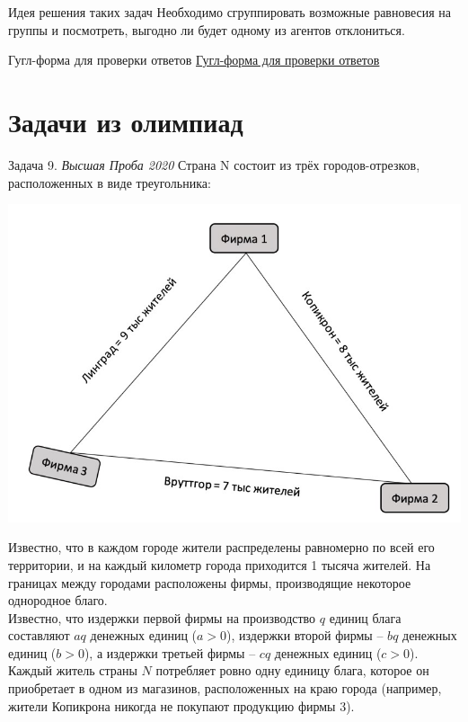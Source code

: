 \begin{mybox}{Идея решения таких задач}
    Необходимо сгруппировать возможные равновесия на группы и посмотреть, выгодно ли будет одному из агентов
    отклониться.
\end{mybox}

\begin{mybox}{Гугл-форма для проверки ответов}
    \href{https://forms.gle/1FkPGARXqSBnACzs8}{Гугл-форма для проверки ответов}
\end{mybox}

\section{Задачи из олимпиад}

\begin{mybox}{Задача 9. \textit{Высшая Проба 2020}}
    \indent\setlength{\parindent}{1em}\indent\setlength{\parindent}{1em}Страна N состоит из трёх городов-отрезков,
    расположенных в виде треугольника:
    \begin{center}
        \includegraphics[width=0.5\linewidth]{static/4_9}
    \end{center}
    \indent\setlength{\parindent}{1em}\indent\setlength{\parindent}{1em}Известно, что в каждом городе жители
    распределены равномерно по всей его территории, и на каждый километр города приходится 1 тысяча жителей. На
    границах между городами расположены фирмы, производящие некоторое однородное благо.\\
    \indent\setlength{\parindent}{1em}Известно, что издержки первой фирмы на производство $q$ единиц блага составляют
    $aq$ денежных единиц ($a>0$), издержки второй фирмы – $bq$ денежных единиц ($b>0$), а издержки третьей фирмы – $cq$
    денежных единиц ($c>0$).\\
    \indent\setlength{\parindent}{1em}Каждый житель страны $N$ потребляет ровно одну единицу блага, которое он
    приобретает в одном из магазинов, расположенных на краю города (например, жители Копикрона никогда не покупают
    продукцию фирмы 3).\\

\end{mybox}

